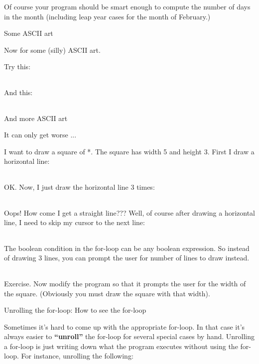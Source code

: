 \documentclass[
]{article}
\begin{document}
Of course your program should be smart enough to compute the number of
days in the month (including leap year cases for the month of February.)

Some ASCII art

Now for some (silly) ASCII art.

Try this:

\begin{longtable}[]{@{}@{}}
\toprule
\endhead
\bottomrule
\end{longtable}

And this:

\begin{longtable}[]{@{}@{}}
\toprule
\endhead
\bottomrule
\end{longtable}

And more ASCII art

It can only get worse ...

I want to draw a square of *. The square has width 5 and height 3. First
I draw a horizontal line:

\begin{longtable}[]{@{}@{}}
\toprule
\endhead
\bottomrule
\end{longtable}

OK. Now, I just draw the horizontal line 3 times:

\begin{longtable}[]{@{}@{}}
\toprule
\endhead
\bottomrule
\end{longtable}

Oops! How come I get a straight line??? Well, of course after drawing a
horizontal line, I need to skip my cursor to the next line:

\begin{longtable}[]{@{}@{}}
\toprule
\endhead
\bottomrule
\end{longtable}

The boolean condition in the for-loop can be any boolean expression. So
instead of drawing 3 lines, you can prompt the user for number of lines
to draw instead.

\begin{longtable}[]{@{}@{}}
\toprule
\endhead
\bottomrule
\end{longtable}

Exercise. Now modify the program so that it prompts the user for the
width of the square. (Obviously you must draw the square with that
width).

Unrolling the for-loop: How to see the for-loop

Sometimes it's hard to come up with the appropriate for-loop. In that
case it's always easier to \textbf{``unroll''} the for-loop for several
special cases by hand. Unrolling a for-loop is just writing down what
the program executes without using the for-loop. For instance, unrolling
the following:
\end{document}

